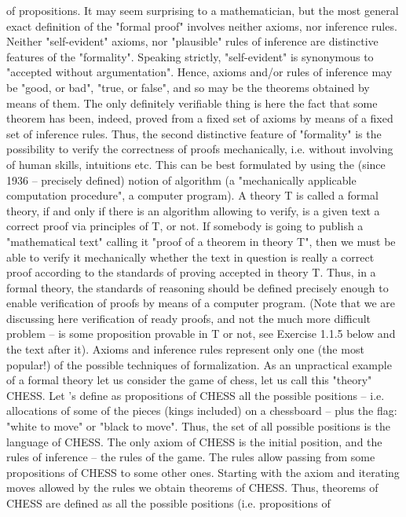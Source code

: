 of propositions.
It may seem surprising to a mathematician, but the most general exact definition of the "formal proof"
involves neither axioms, nor inference rules. Neither "self-evident" axioms, nor "plausible" rules of
inference are distinctive features of the "formality". Speaking strictly, "self-evident" is synonymous to
"accepted without argumentation". Hence, axioms and/or rules of inference may be "good, or bad", "true,
or false", and so may be the theorems obtained by means of them. The only definitely verifiable thing is
here the fact that some theorem has been, indeed, proved from a fixed set of axioms by means of a fixed
set of inference rules.
Thus, the second distinctive feature of "formality" is the possibility to verify the correctness of proofs
mechanically, i.e. without involving of human skills, intuitions etc. This can be best formulated by using
the (since 1936 – precisely defined) notion of algorithm (a "mechanically applicable computation
procedure", a computer program).
A theory T is called a formal theory, if and only if there is an algorithm allowing to verify, is a given
text a correct proof via principles of T, or not. If somebody is going to publish a "mathematical text"
calling it "proof of a theorem in theory T", then we must be able to verify it mechanically whether the text
in question is really a correct proof according to the standards of proving accepted in theory T. Thus, in a
formal theory, the standards of reasoning should be defined precisely enough to enable verification of
proofs by means of a computer program. (Note that we are discussing here verification of ready proofs,
and not the much more difficult problem – is some proposition provable in T or not, see Exercise 1.1.5
below and the text after it).
Axioms and inference rules represent only one (the most popular!) of the possible techniques of
formalization.
As an unpractical example of a formal theory let us consider the game of chess, let us call this "theory"
CHESS. Let 's define as propositions of CHESS all the possible positions – i.e. allocations of some of the
pieces (kings included) on a chessboard – plus the flag: "white to move" or "black to move". Thus, the set
of all possible positions is the language of CHESS. The only axiom of CHESS is the initial position, and
the rules of inference – the rules of the game. The rules allow passing from some propositions of CHESS
to some other ones. Starting with the axiom and iterating moves allowed by the rules we obtain theorems
of CHESS. Thus, theorems of CHESS are defined as all the possible positions (i.e. propositions of
